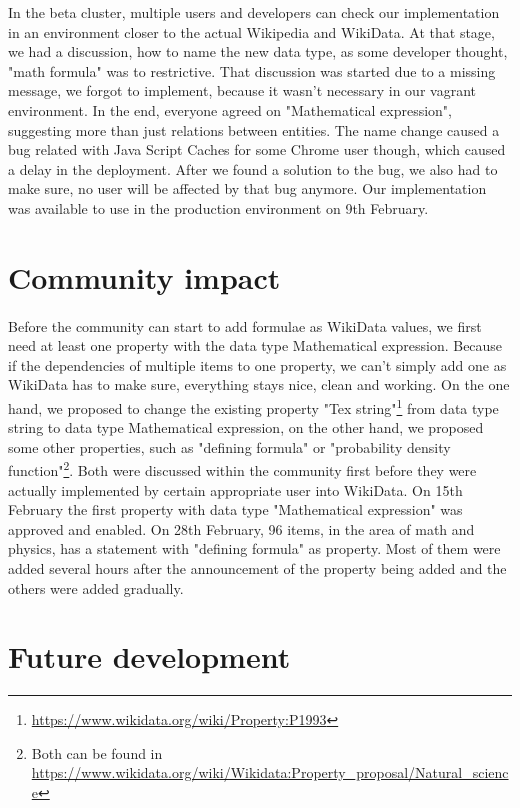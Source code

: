 \documentclass[12pt]{article}
\begin{document}
In the beta cluster, multiple users and developers can check our implementation in an environment closer to the actual Wikipedia and WikiData. At that stage, we had a discussion, how to name the new data type, as some developer thought, "math formula" was to restrictive. That discussion was started due to a missing message, we forgot to implement, because it wasn't necessary in our vagrant environment. In the end, everyone agreed on "Mathematical expression", suggesting more than just relations between entities. The name change caused a bug related with Java Script Caches for some Chrome user though, which caused a delay in the deployment. After we found a solution to the bug, we also had to make sure, no user will be affected by that bug anymore. Our implementation was available to use in the production environment on 9th February.

\section{Community impact}
\paragraph{}
Before the community can start to add formulae as WikiData values, we first need at least one property with the data type Mathematical expression. Because if the dependencies of multiple items to one property, we can't simply add one as WikiData has to make sure, everything stays nice, clean and working. On the one hand, we proposed to change the existing property "Tex string"\footnote{\url{https://www.wikidata.org/wiki/Property:P1993}} from data type string to data type Mathematical expression, on the other hand, we proposed some other properties, such as "defining formula" or "probability density function"\footnote{Both can be found in \url{https://www.wikidata.org/wiki/Wikidata:Property_proposal/Natural_science}}. Both were discussed within the community first before they were actually implemented by certain appropriate user into WikiData.
On 15th February the first property with data type "Mathematical expression" was approved and enabled. On 28th February, 96 items, in the area of math and physics, has a statement with "defining formula" as property. Most of them were added several hours after the announcement of the property being added and the others were added gradually. 

\section{Future development}
\end{document}
